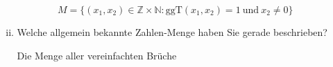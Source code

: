 \begin{enumerate}[(a)]
\begin{enumerate}[i)]
                $$M = \{ (x_1, x_2) \in \mathbb{Z} \times \mathbb{N} : \text{ggT}(x_1, x_2) = 1\ \text{und}\ x_2 \neq 0 \}$$

            \item Welche allgemein bekannte Zahlen-Menge haben Sie gerade beschrieben?

                Die Menge aller vereinfachten Brüche
        \end{enumerate}
\end{enumerate}

